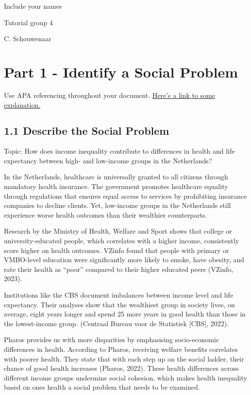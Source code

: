 \documentclass[
]{article}
\begin{document}
Include your names

Tutorial group 4

C. Schouwenaar

\section{Part 1 - Identify a Social
Problem}\label{part-1---identify-a-social-problem}

Use APA referencing throughout your document.
\href{https://www.mendeley.com/guides/apa-citation-guide/}{Here's a link
to some explanation.}

\subsection{1.1 Describe the Social
Problem}\label{describe-the-social-problem}

Topic: How does income inequality contribute to differences in health
and life expectancy between high- and low-income groups in the
Netherlands?

In the Netherlands, healthcare is universally granted to all citizens
through mandatory health insurance. The government promotes healthcare
equality through regulations that ensures equal access to services by
prohibiting insurance companies to decline clients. Yet, low-income
groups in the Netherlands still experience worse health outcomes than
their wealthier counterparts.

Research by the Ministry of Health, Welfare and Sport shows that college
or university-educated people, which correlates with a higher income,
consistently score higher on health outcomes. VZinfo found that people
with primary or VMBO-level education were significantly more likely to
smoke, have obesity, and rate their health as ``poor'' compared to their
higher educated peers (VZinfo, 2023).

Institutions like the CBS document imbalances between income level and
life expectancy. Their analyses show that the wealthiest group in
society lives, on average, eight years longer and spend 25 more years in
good health than those in the lowest-income group. (Centraal Bureau voor
de Statistiek {[}CBS{]}, 2022).

Pharos provides us with more disparities by emphasising socio-economic
differences in health. According to Pharos, receiving welfare benefits
correlates with poorer health. They state that with each step up on the
social ladder, their chance of good health increases (Pharos, 2022).
These health differences across different income groups undermine social
cohesion, which makes health inequality based on ones health a social
problem that needs to be examined.
\end{document}
